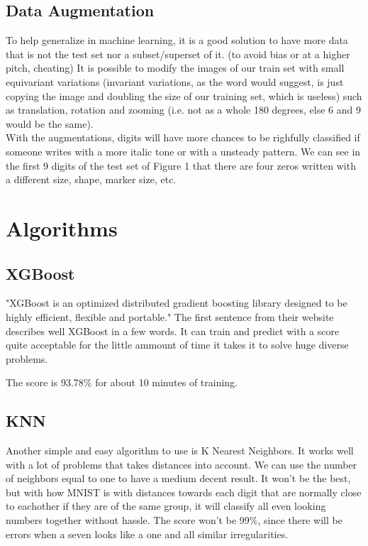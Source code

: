 \documentclass{article}
\begin{document}
\subsection{Data Augmentation}
To help generalize in machine learning, it is a good solution to have more data
that is not the test set nor a subset/superset of it. (to avoid bias or at a
higher pitch, cheating) It is possible to modify the images of our train set
with small equivariant variations (invariant variations, as the word would
suggest, is just copying the image and doubling the size of our training set,
which is useless) such as translation, rotation and zooming (i.e. not as a 
whole 180 degrees, else 6 and 9 would be the same). \\

With the augmentations, digits will have more chances to be righfully classified
if someone writes with a more italic tone or with a unsteady pattern. We can see
in the first 9 digits of the test set of Figure 1 that there are four zeros
written with a different size, shape, marker size, etc.

\section{Algorithms}
\subsection{XGBoost}
"XGBoost is an optimized distributed gradient boosting library designed to be 
highly efficient, flexible and portable." The first sentence from their website
describes well XGBoost in a few words. It can train and predict with a score
quite acceptable for the little ammount of time it takes it to solve huge 
diverse problems.

The score is 93.78\% for about 10 minutes of training.

\subsection{KNN}
Another simple and easy algorithm to use is K Nearest Neighbors. It works well
with a lot of problems that takes distances into account. We can use the number
of neighbors equal to one to have a medium decent result. It won't be the best,
but with how MNIST is with distances towards each digit that are normally close
to eachother if they are of the same group, it will classify all even looking
numbers together without hassle. The score won't be 99\%, since there will be
errors when a seven looks like a one and all similar irregularities.
\end{document}
